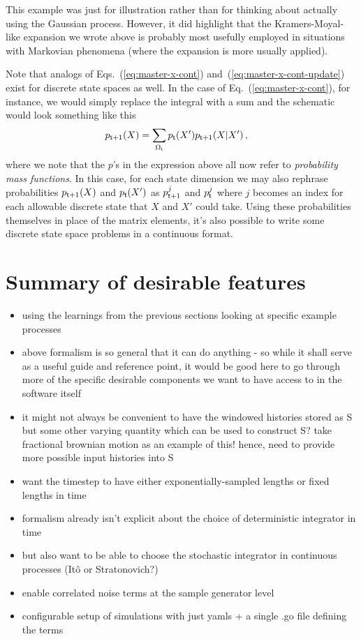 \documentclass{book}
\begin{document}
This example was just for illustration rather than for thinking about actually using the Gaussian process. However, it did highlight that the Kramers-Moyal-like expansion we wrote above is probably most usefully employed in situations with Markovian phenomena (where the expansion is more usually applied).

Note that analogs of Eqs.~(\ref{eq:master-x-cont}) and~(\ref{eq:master-x-cont-update}) exist for discrete state spaces as well. In the case of Eq.~(\ref{eq:master-x-cont}), for instance, we would simply replace the integral with a sum and the schematic would look something like this
\begin{align}
p_{{\sf t}+1}(X) &= \sum_{\Omega_{\sf t}} p_{\sf t}(X') p_{{\sf t}+1}(X \vert X') \label{eq:master-x-disc} \,,
\end{align}
where we note that the $p$'s in the expression above all now refer to \emph{probability mass functions}. In this case, for each state dimension we may also rephrase probabilities $p_{{\sf t}+1}(X)$ and $p_{{\sf t}}(X')$ as $p^j_{{\sf t}+1}$ and $p^j_{{\sf t}}$ where $j$ becomes an index for each allowable discrete state that $X$ and $X'$ could take. Using these probabilities themselves in place of the matrix elements, it's also possible to write some discrete state space problems in a continuous format.

\section{\sffamily Summary of desirable features}

\begin{itemize}
\item{using the learnings from the previous sections looking at specific example processes}
\item{above formalism is so general that it can do anything - so while it shall serve as a useful guide and reference point, it would be good here to go through more of the specific desirable components we want to have access to in the software itself}
\item{it might not always be convenient to have the windowed histories stored as S but some other varying quantity which can be used to construct S? take fractional brownian motion as an example of this! hence, need to provide more possible input histories into S}
\item{want the timestep to have either exponentially-sampled lengths or fixed lengths in time}
\item{formalism already isn't explicit about the choice of deterministic integrator in time}
\item{but also want to be able to choose the stochastic integrator in continuous processes (Itô or Stratonovich?)}
\item{enable correlated noise terms at the sample generator level}
\item{configurable setup of simulations with just yamls + a single .go file defining the terms}
\end{itemize}
\end{document}
